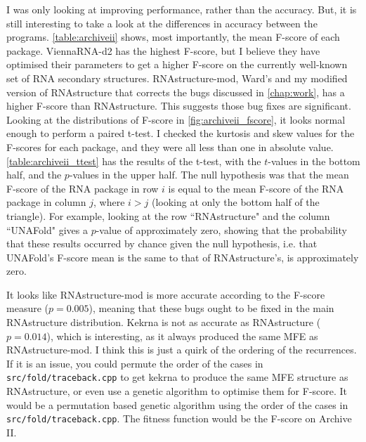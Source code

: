 \documentclass{cshonours}
\begin{document}
I was only looking at improving performance, rather than the accuracy. But, it is still interesting to take a look at the differences in accuracy between the programs. \autoref{table:archiveii} shows, most importantly, the mean F-score of each package. ViennaRNA-d2 has the highest F-score, but I believe they have optimised their parameters to get a higher F-score on the currently well-known set of RNA secondary structures. RNAstructure-mod, Ward's and my modified version of RNAstructure that corrects the bugs discussed in \autoref{chap:work}, has a higher F-score than RNAstructure. This suggests those bug fixes are significant. Looking at the distributions of F-score in \autoref{fig:archiveii_fscore}, it looks normal enough to perform a paired t-test. I checked the kurtosis and skew values for the F-scores for each package, and they were all less than one in absolute value. \autoref{table:archiveii_ttest} has the results of the t-test, with the $t$-values in the bottom half, and the $p$-values in the upper half. The null hypothesis was that the mean F-score of the RNA package in row $i$ is equal to the mean F-score of the RNA package in column $j$, where $i > j$ (looking at only the bottom half of the triangle). For example, looking at the row ``RNAstructure" and the column ``UNAFold" gives a $p$-value of approximately zero, showing that the probability that these results occurred by chance given the null hypothesis, i.e. that UNAFold's F-score mean is the same to that of RNAstructure's, is approximately zero.

It looks like RNAstructure-mod is more accurate according to the F-score measure ($p=0.005$), meaning that these bugs ought to be fixed in the main RNAstructure distribution. Kekrna is not as accurate as RNAstructure ($p=0.014$), which is interesting, as it always produced the same MFE as RNAstructure-mod. I think this is just a quirk of the ordering of the recurrences. If it is an issue, you could permute the order of the cases in \texttt{src/fold/traceback.cpp} to get kekrna to produce the same MFE structure as RNAstructure, or even use a genetic algorithm to optimise them for F-score. It would be a permutation based genetic algorithm using the order of the cases in \texttt{src/fold/traceback.cpp}. The fitness function would be the F-score on Archive II.
\end{document}
